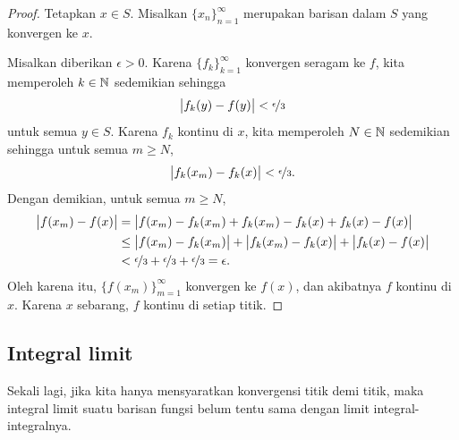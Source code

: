 \begin{proof}
Tetapkan $x \in S$.  Misalkan $\{ x_n \}_{n=1}^\infty$ merupakan barisan dalam $S$
yang konvergen ke $x$.

Misalkan diberikan $\epsilon > 0$.
Karena $\{ f_k \}_{k=1}^\infty$ konvergen seragam ke $f$, kita memperoleh $k \in {\mathbb{N}}$ sedemikian sehingga
\begin{equation*}
\bigl\lvert {f_k(y)-f(y)} \bigr\rvert < \nicefrac{\epsilon}{3}
\end{equation*}
untuk semua $y \in S$.  Karena $f_k$ kontinu di $x$,
kita memperoleh $N \in {\mathbb{N}}$ sedemikian sehingga untuk semua $m \geq N$,
\begin{equation*}
\bigl\lvert {f_k(x_m)-f_k(x)} \bigr\rvert < \nicefrac{\epsilon}{3} .
\end{equation*}
Dengan demikian, untuk semua
$m \geq N$,
\begin{equation*}
\begin{split}
\bigl\lvert {f(x_m)-f(x)} \bigr\rvert
& =
\bigl\lvert {f(x_m)-f_k(x_m)+f_k(x_m)-f_k(x)+f_k(x)-f(x)} \bigr\rvert
\\
& \leq
\bigl\lvert {f(x_m)-f_k(x_m)} \bigr\rvert+
\bigl\lvert {f_k(x_m)-f_k(x)} \bigr\rvert+
\bigl\lvert {f_k(x)-f(x)} \bigr\rvert
\\
& <
\nicefrac{\epsilon}{3} +
\nicefrac{\epsilon}{3} +
\nicefrac{\epsilon}{3} = \epsilon .
\end{split}
\end{equation*}
Oleh karena itu, $\bigl\{ f(x_m) \bigr\}_{m=1}^\infty$ konvergen ke $f(x)$,
dan akibatnya $f$ kontinu di $x$.
Karena $x$ sebarang, $f$ kontinu di setiap titik.
\end{proof}

\subsection{Integral limit}

Sekali lagi, jika kita hanya mensyaratkan konvergensi titik demi titik, maka integral
limit suatu barisan fungsi belum tentu sama dengan limit
integral-integralnya.

